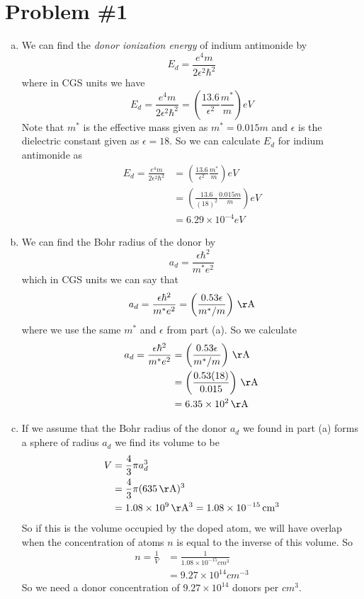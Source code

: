 \documentclass[11pt]{article}
\numberwithin{equation}{section}
\begin{document}


\section{Problem \#1}
\begin{enumerate}[(a)]
\item
We can find the \emph{donor ionization energy} of indium antimonide by
\begin{equation}
E_d = \frac{e^4m}{2\epsilon^2\hbar^2}
\label{IonEn}
\end{equation}
where in CGS units we have
$$E_d = \frac{e^4m}{2\epsilon^2\hbar^2} = \left(\frac{13.6}{\epsilon^2}\frac{m^*}{m}\right)\unit{eV}$$
Note that $m^*$ is the effective mass given as $m^* = 0.015m$ and $\epsilon$ is the dielectric constant given as $\epsilon=18$. So we can calculate $E_d$ for indium antimonide as
\begin{align*}
E_d = \frac{e^4m}{2\epsilon^2\hbar^2} &= \left(\frac{13.6}{\epsilon^2}\frac{m^*}{m}\right)\unit{eV}\\
&= \left(\frac{13.6}{(18)^2}\frac{0.015m}{m}\right)\unit{eV}\\
&= 6.29\times10^{-4}\unit{eV}
\end{align*}

\item
We can find the Bohr radius of the donor by
\begin{equation}
a_d = \frac{\epsilon\hbar^2}{m^*e^2}  
\label{Bohr}
\end{equation}
which in CGS units we can say that
$$a_d = \frac{\epsilon\hbar^2}{m^*e^2} = \left(\frac{0.53\epsilon}{m^*/m}\right)\unit{\AA}$$
where we use the same $m^*$ and $\epsilon$ from part (a). So we calculate
\begin{align*}
a_d = \frac{\epsilon\hbar^2}{m^*e^2} &= \left(\frac{0.53\epsilon}{m^*/m}\right)\unit{\AA}\\
&= \left(\frac{0.53(18)}{0.015}\right)\unit{\AA}\\
&= 6.35\times10^{2}\unit{\AA}
\end{align*}

\item
If we assume that the Bohr radius of the donor $a_d$ we found in part (a) forms a sphere of radius $a_d$ we find its volume to be
\begin{align*}
V &= \frac{4}{3}\pi a_d^3\\
&= \frac{4}{3}\pi (635\unit{\AA})^3\\
&= 1.08\times10^{9}\unit{\AA^3} = 1.08\times10^{-15}\unit{cm^3}
\end{align*}
So if this is the volume occupied by the doped atom, we will have overlap when the concentration of atoms $n$ is equal to the inverse of this volume. So
\begin{align*}
n = \frac{1}{V} &= \frac{1}{1.08\times10^{-15}\unit{cm^3}}\\
&= 9.27\times10^{14}\unit{cm^{-3}}
\end{align*}
So we need a donor concentration of $9.27\times10^{14}$ donors per $\unit{cm^{3}}$.
\end{enumerate}
\end{document}
